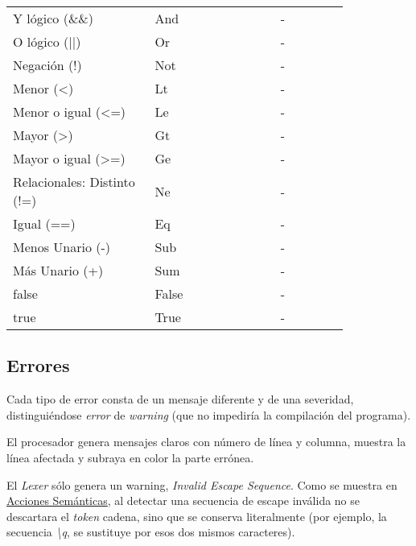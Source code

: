 \documentclass[a4paper]{CSMakotoTechnicalReport}
\begin{document}
\begin{multicols}{2}
\begin{table}[H]
\begin{tabular}{L{0.35\linewidth} L{0.31\linewidth} L{0.17\linewidth}}
            Y lógico (\&\&) & And & - \\
            O lógico (||) & Or & - \\
            Negación (!) & Not & - \\
            Menor (<) & Lt & - \\
            Menor o igual (<=) & Le & - \\
            Mayor (>) & Gt & - \\
            Mayor o igual (>=) & Ge & - \\
            Relacionales: Distinto (!=) & Ne & - \\
            Igual (==) & Eq & - \\
            Menos Unario (-) & Sub & - \\
            Más Unario (+) & Sum & - \\
            false & False & - \\
            true & True & - \\
            \bottomrule
        \end{tabular}
        \label{tab:tokens}
    \end{table}

    \subsection{Errores}

    Cada tipo de error consta de un mensaje diferente y de una severidad, distinguiéndose \textit{error} de \textit{warning} (que no impediría la compilación del programa).

    El procesador genera mensajes claros con número de línea y columna, muestra la línea afectada y subraya en color la parte errónea.

    El \textit{Lexer} sólo genera un warning, \textit{Invalid Escape Sequence}. Como se muestra en \hyperref[subsec:acciones-semanticas]{Acciones Semánticas}, al detectar una secuencia de escape inválida no se descartara el \textit{token} cadena, sino que se conserva literalmente (por ejemplo, la secuencia \textit{\textbackslash q}, se sustituye por esos dos mismos caracteres).


\end{multicols}
\end{document}
